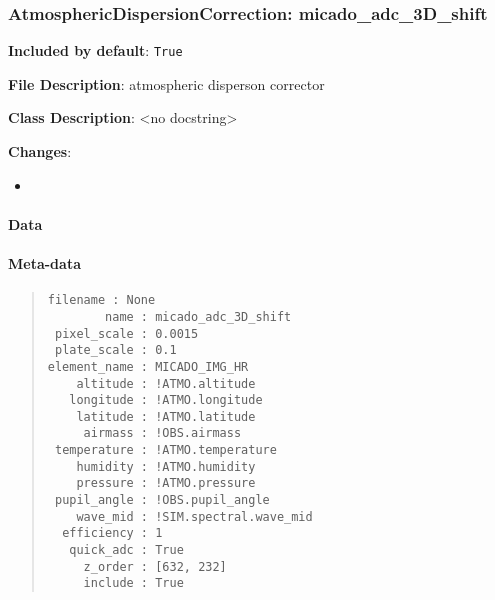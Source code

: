 \subsubsection{AtmosphericDispersionCorrection: \textquotedbl{}micado\_adc\_3D\_shift\textquotedbl{}%
  \label{atmosphericdispersioncorrection-micado-adc-3d-shift}%
}

\textbf{Included by default}: \texttt{True}

\textbf{File Description}: atmospheric disperson corrector

\textbf{Class Description}: <no docstring>

\textbf{Changes}:

\begin{itemize}
\item \end{itemize}


\paragraph{Data%
  \label{id1}%
}


\paragraph{Meta-data%
  \label{id2}%
}

\begin{quote}
\begin{alltt}
\begin{lstlisting}[frame=single]
    filename : None
        name : micado_adc_3D_shift
 pixel_scale : 0.0015
 plate_scale : 0.1
element_name : MICADO_IMG_HR
    altitude : !ATMO.altitude
   longitude : !ATMO.longitude
    latitude : !ATMO.latitude
     airmass : !OBS.airmass
 temperature : !ATMO.temperature
    humidity : !ATMO.humidity
    pressure : !ATMO.pressure
 pupil_angle : !OBS.pupil_angle
    wave_mid : !SIM.spectral.wave_mid
  efficiency : 1
   quick_adc : True
     z_order : [632, 232]
     include : True
\end{lstlisting}
\end{alltt}
\end{quote}

